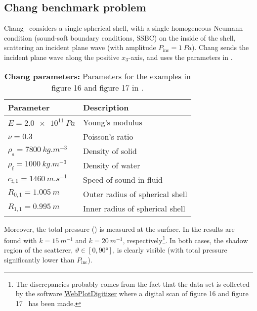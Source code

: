 \subsection{Chang benchmark problem} 
Chang~\cite{Chang1994soa} considers a single spherical shell, with a single homogeneous Neumann condition (sound-soft boundary conditions, SSBC) on the inside of the shell, scattering an incident plane wave (with amplitude $P_{\mathrm{inc}}=\SI{1}{Pa}$). Chang sends the incident plane wave along the positive $x_3$-axis, and uses the parameters in .
\begin{table}
	\centering
	\caption{\textbf{Chang parameters:} Parameters for the examples in figure 16 and figure 17 in \cite{Chang1994soa}.}
	\label{Tab1:Chang}
	\begin{tabular}{l l}
		\toprule
		Parameter & Description\\
		\midrule
		$E = \SI{2.0e11}{Pa}$ & Young's modulus\\
		$\nu = 0.3$ & Poisson's ratio\\
		$\rho_{\mathrm{s}} = \SI{7800}{kg.m^{-3}}$ & Density of solid\\
		$\rho_{\mathrm{f}} = \SI{1000}{kg.m^{-3}}$ & Density of water\\
		$c_{\mathrm{f},1} = \SI{1460}{m.s^{-1}}$ & Speed of sound in fluid\\
		$R_{0,1} = \SI{1.005}{m}$ & Outer radius of spherical shell\\
		$R_{1,1} = \SI{0.995}{m}$ & Inner radius of spherical shell\\
		\bottomrule
	\end{tabular}
\end{table}
Moreover, the total pressure () is measured at the surface. In  the results are found with $k=\SI{15}{m^{-1}}$ and $k=\SI{20}{m^{-1}}$, respectively\footnote{The discrepancies probably comes from the fact that the data set is collected by the software \href{https://automeris.io/WebPlotDigitizer/}{WebPlotDigitizer} where a digital scan of figure 16 and figure 17~\cite[pp. 32-33]{Chang1994soa} has been made.}. In both cases, the shadow region of the scatterer, $\vartheta\in [0,\ang{90}]$, is clearly visible (with total pressure significantly lower than $P_{\mathrm{inc}}$).
